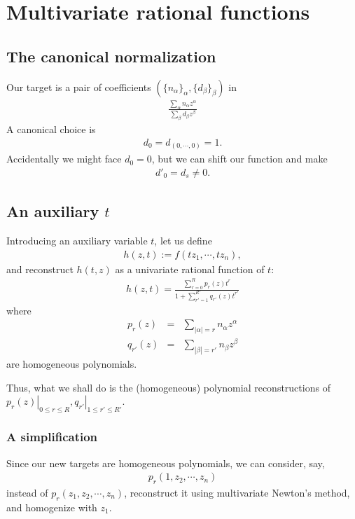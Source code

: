 \documentclass[11pt]{book}
\begin{document}
\section{Multivariate rational functions}
\subsection{The canonical normalization}
Our target is a pair of coefficients $(\{ n_\alpha\}_\alpha, \{ d_\beta\}_\beta)$ in
\begin{eqnarray}
\frac{\sum_\alpha n_\alpha z^\alpha}{\sum_\beta d_\beta z^\beta}
\end{eqnarray}
A canonical choice is
\begin{eqnarray}
d_0 = d_{(0,\cdots,0)} = 1.
\end{eqnarray}
Accidentally we might face $d_0 = 0$, but we can shift our function and make
\begin{eqnarray}
d'_0 = d_{s} \neq 0.
\end{eqnarray}

\subsection{An auxiliary $t$}
Introducing an auxiliary variable $t$, let us define
\begin{eqnarray}
h(z,t) := f(tz_1, \cdots, tz_n),
\end{eqnarray}
and reconstruct $h(t,z)$ as a univariate rational function of $t$:
\begin{eqnarray}
h(z, t) = \frac{\sum_{r=0}^R p_r(z) t^r}{1+ \sum_{r'=1}^{R'} q_{r'}(z) t^{r'}}
\end{eqnarray}
where
\begin{eqnarray}
p_r(z) &=& \sum_{|\alpha| = r} n_\alpha z^\alpha \\
q_{r'}(z) &=& \sum_{|\beta| = r'} n_\beta z^\beta
\end{eqnarray}
are homogeneous polynomials.

Thus, what we shall do is the (homogeneous) polynomial reconstructions of $\left. p_r(z) \right|_{0 \leq r \leq R}, \left. q_{r'} \right|_{1 \leq r' \leq R'}$.

\subsubsection{A simplification}
Since our new targets are homogeneous polynomials, we can consider, say,
\begin{eqnarray}
p_r(1, z_2, \cdots, z_n)
\end{eqnarray}
instead of $p_r(z_1, z_2, \cdots, z_n)$, reconstruct it using multivariate Newton's method, and homogenize with $z_1$.
\end{document}
